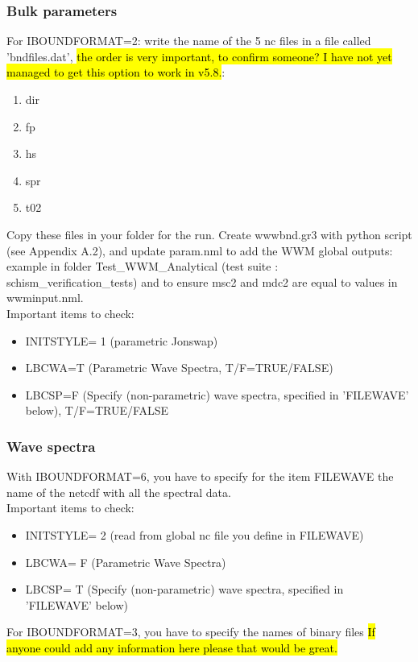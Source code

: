 \documentclass[preprints,briefreport,accept,oneauthor,pdftex]{Definitions/mdpi}
\begin{document}
\subsubsection{Bulk parameters}
\noindent For IBOUNDFORMAT=2: write the name of the 5 nc files in a file called 'bndfiles.dat', \hl{the order is very important, to confirm someone? I have not yet managed to get this option to work in v5.8.}: \begin{enumerate}
    \item dir
    \item fp
    \item hs
    \item spr
    \item t02
\end{enumerate}
Copy these files in your folder for the run. Create wwwbnd.gr3 with python script (see Appendix A.2), and update param.nml to add the WWM global outputs: example in folder Test\_WWM\_Analytical (test suite : schism\_verification\_tests) and to ensure msc2 and mdc2 are equal to values in wwminput.nml.\\
Important items to check:
\begin{itemize}
    \item INITSTYLE= 1 (parametric Jonswap)
    \item LBCWA=T (Parametric Wave Spectra, T/F=TRUE/FALSE)
    \item LBCSP=F (Specify (non-parametric) wave spectra, specified in 'FILEWAVE' below),  T/F=TRUE/FALSE
\end{itemize}
\subsubsection{Wave spectra}
\noindent With IBOUNDFORMAT=6, you have to specify for the item FILEWAVE the name of the netcdf with all the spectral data.\\
Important items to check:
\begin{itemize}
   \item INITSTYLE= 2 (read from global nc file you define in FILEWAVE)
    \item LBCWA= F (Parametric Wave Spectra)
    \item LBCSP= T (Specify (non-parametric) wave spectra, specified in 'FILEWAVE' below)
\end{itemize}

For IBOUNDFORMAT=3, you have to specify the names of binary files \hl{If anyone could add any information here please that would be great.}
\end{document}

